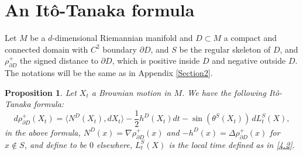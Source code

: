\documentclass[10pt]{amsart}
\theoremstyle{plain}
\newtheorem{prop}[thm]{Proposition}
\theoremstyle{definition}
\let\D\Delta
\let\n\nabla
\begin{document}
\section{An Itô-Tanaka formula}\label{AppendixF}

Let $M$ be a $d$-dimensional Riemannian manifold
{and} $D\subset M$ a {compact and} connected domain with $C^2$ boundary $\partial D$, and $S$ be the regular skeleton of $D$, and $ \rho^{+}_{\partial D}$ the signed distance to $\partial D$, which is positive inside $D$ and negative outside $D$. The notations will be the same as in Appendix \ref{Section2}.

\begin{prop}\label{PropF1}
Let $X_t$ a Brownian motion in $M$. We have the following Itô-Tanaka formula:
\[
d \rho^{+}_{\partial D} (X_t) = \langle N^D(X_t), dX_t \rangle -\frac{1}{2} h^D(X_t) dt - \sin\left(\theta^{S}(X_t)\right)\,dL_t^{S}(X),
\]
in the above formula, $N^D(x) = \n \rho^{+}_{\partial D} (x) $ and
$ - h^D(x) = \D \rho^{+}_{\partial D} (x)$ for $x \notin S $, and define to be $ 0$ elsewhere, $L_t^S(X)$ is the local time defined as in \eqref{4.2}.
\end{prop}
\end{document}
